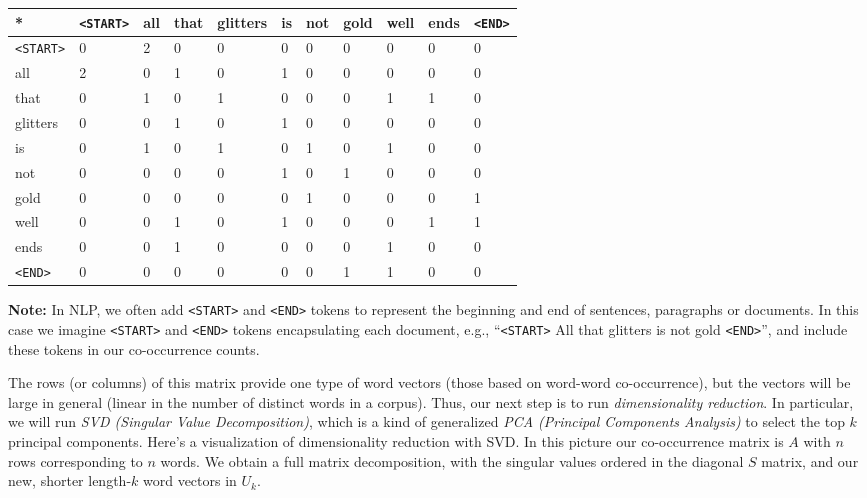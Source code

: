 \documentclass[11pt]{article}
\begin{document}
\begin{longtable}[]{@{}lllllllllll@{}}
\toprule
* & \texttt{\textless{}START\textgreater{}} & all & that & glitters & is
& not & gold & well & ends & \texttt{\textless{}END\textgreater{}} \\
\midrule
\endhead
\texttt{\textless{}START\textgreater{}} & 0 & 2 & 0 & 0 & 0 & 0 & 0 & 0
& 0 & 0 \\
all & 2 & 0 & 1 & 0 & 1 & 0 & 0 & 0 & 0 & 0 \\
that & 0 & 1 & 0 & 1 & 0 & 0 & 0 & 1 & 1 & 0 \\
glitters & 0 & 0 & 1 & 0 & 1 & 0 & 0 & 0 & 0 & 0 \\
is & 0 & 1 & 0 & 1 & 0 & 1 & 0 & 1 & 0 & 0 \\
not & 0 & 0 & 0 & 0 & 1 & 0 & 1 & 0 & 0 & 0 \\
gold & 0 & 0 & 0 & 0 & 0 & 1 & 0 & 0 & 0 & 1 \\
well & 0 & 0 & 1 & 0 & 1 & 0 & 0 & 0 & 1 & 1 \\
ends & 0 & 0 & 1 & 0 & 0 & 0 & 0 & 1 & 0 & 0 \\
\texttt{\textless{}END\textgreater{}} & 0 & 0 & 0 & 0 & 0 & 0 & 1 & 1 &
0 & 0 \\
\bottomrule
\end{longtable}

\textbf{Note:} In NLP, we often add
\texttt{\textless{}START\textgreater{}} and
\texttt{\textless{}END\textgreater{}} tokens to represent the beginning
and end of sentences, paragraphs or documents. In this case we imagine
\texttt{\textless{}START\textgreater{}} and
\texttt{\textless{}END\textgreater{}} tokens encapsulating each
document, e.g., ``\texttt{\textless{}START\textgreater{}} All that
glitters is not gold \texttt{\textless{}END\textgreater{}}'', and
include these tokens in our co-occurrence counts.

The rows (or columns) of this matrix provide one type of word vectors
(those based on word-word co-occurrence), but the vectors will be large
in general (linear in the number of distinct words in a corpus). Thus,
our next step is to run \emph{dimensionality reduction}. In particular,
we will run \emph{SVD (Singular Value Decomposition)}, which is a kind
of generalized \emph{PCA (Principal Components Analysis)} to select the
top \(k\) principal components. Here's a visualization of dimensionality
reduction with SVD. In this picture our co-occurrence matrix is \(A\)
with \(n\) rows corresponding to \(n\) words. We obtain a full matrix
decomposition, with the singular values ordered in the diagonal \(S\)
matrix, and our new, shorter length-\(k\) word vectors in \(U_k\).
\end{document}
